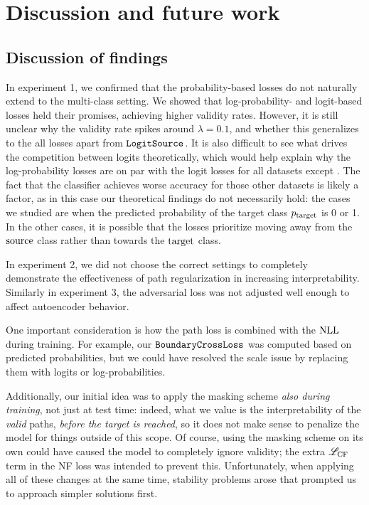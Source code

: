\documentclass[../main.tex]{subfiles}
\begin{document}
\chapter{Discussion and future work}
\label{ch:discussion}

\section{Discussion of findings}

In experiment 1, we confirmed that the probability-based losses do not naturally extend to the multi-class setting.
We showed that log-probability- and logit-based losses held their promises, achieving higher validity rates.
However, it is still unclear why the validity rate spikes around $\lambda = 0.1$, and whether this generalizes
to the all losses apart from $\mathtt{LogitSource}_{}$.
It is also difficult to see what drives the competition between logits theoretically,
which would help explain why the log-probability losses are on par with the logit losses for all datasets except \CakeOnSea.
The fact that the classifier achieves worse accuracy for those other datasets is likely a factor,
as in this case our theoretical findings do not necessarily hold:
the cases we studied are when the predicted probability of the target class $p_{\mathrm{target}}$ is 0 or 1.
In the other cases, it is possible that the losses prioritize moving away from the $\mathrm{source}$ class rather
than towards the $\mathrm{target}$ class.

In experiment 2, we did not choose the correct settings to completely demonstrate the effectiveness of path regularization
in increasing interpretability.
Similarly in experiment 3, the adversarial loss was not adjusted well enough to affect autoencoder behavior.

One important consideration is how the path loss is combined with the $\text{NLL}$ during training.
For example, our $\mathtt{BoundaryCrossLoss}$ was computed based on predicted probabilities, but we could have
resolved the scale issue by replacing them with logits or log-probabilities.

Additionally, our initial idea was to apply the masking scheme \emph{also during training}, not just at test time:
indeed, what we value is the interpretability of the \emph{valid} paths, \emph{before the target is reached}, so it does not make
sense to penalize the model for things outside of this scope.
Of course, using the masking scheme on its own could have caused the model to completely ignore validity; the extra
$\mathscr{L}_\text{CF}$ term in the NF loss was intended to prevent this.
Unfortunately, when applying all of these changes at the same time, stability problems arose that prompted us to
approach simpler solutions first.
\end{document}
